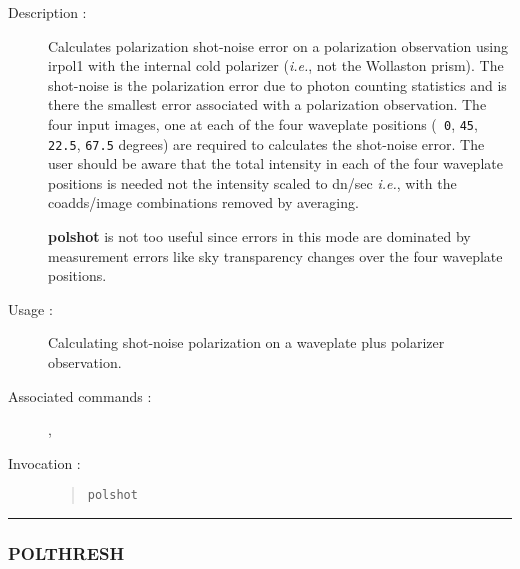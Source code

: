 \begin{description}

\item[Description :] Calculates polarization shot-noise error on a
polarization observation using {\sc irpol1} with the internal cold
polarizer (\emph{i.e.}, not the Wollaston prism).  The shot-noise is
the polarization error due to photon counting statistics and is there
the smallest error associated with a polarization observation.  The
four input images, one at each of the four waveplate positions ({\tt
0}, {\tt 45}, {\tt 22.5}, {\tt 67.5} degrees) are required to
calculates the shot-noise error.  The user should be aware that the
total intensity in each of the four waveplate positions is needed not
the intensity scaled to dn/sec \emph{i.e.}, with the coadds/image
combinations removed by averaging.

{\bf polshot} is not too useful since errors in this mode are dominated
by measurement errors like sky transparency changes over the four
waveplate positions.

\item[Usage :] Calculating shot-noise polarization on a waveplate plus
polarizer observation.

\item[Associated commands :] {\tt {}}, 
{\tt {}}

\item[Invocation :]

\begin{quote}{\tt  polshot }\end{quote}

\end{description}

\hrule 
\subsubsection*{\label{POLTHRESH}POLTHRESH}


